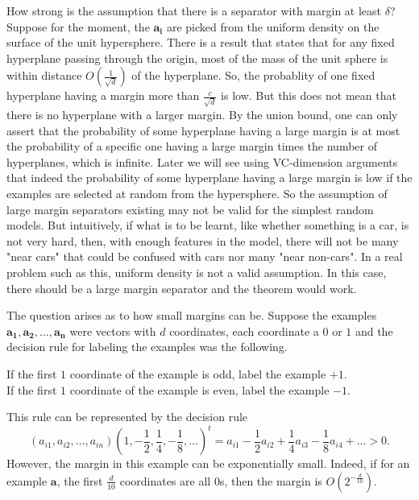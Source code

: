 How strong is the assumption that there is a separator with margin at least \(\delta \)? Suppose for the moment, the \(\mathbf{a_i} \) are picked from the uniform density on the surface of the unit hypersphere. There is a result that states that for any fixed hyperplane passing through the origin, most of the mass of the unit sphere is within distance \(O\left( \frac{1}{\sqrt{d} } \right) \) of the hyperplane. So, the probablity of one fixed hyperplane having a margin more than \(\frac{c}{\sqrt{d} }\) is low. But this does not mean that there is no hyperplane with a larger margin. By the union bound, one can only assert that the probability of some hyperplane having a large margin is at most the probability of a specific one having a large margin times the number of hyperplanes, which is infinite. Later we will see using VC-dimension arguments that indeed the probability of some hyperplane having a large margin is low if the examples are selected at random from the hypersphere. So the assumption of large margin separators existing may not be valid for the simplest random models. But intuitively, if what is to be learnt, like whether something is a car, is not very hard, then, with enough features in the model, there will not be many "near cars" that could be confused with cars nor many "near non-cars". In a real problem such as this, uniform density is not a valid assumption. In this case, there should be a large margin separator and the theorem would work.

The question arises as to how small margins can be. Suppose the examples \(\mathbf{a_1}, \mathbf{a_2}, \dots , \mathbf{a_n}   \) were vectors with \(d\) coordinates, each coordinate a \(0\) or \(1\) and the decision rule for labeling the examples was the following. 

\begin{center}
    If the first \(1\) coordinate of the example is odd, label the example \(+1\). \\
    If the first \(1\) coordinate of the example is even, label the example \(-1\). \\
\end{center}
This rule can be represented by the decision rule 
\[
    \left( a_{i1}, a_{i2}, \dots , a_{in}  \right) \left( 1, -\frac{1}{2}, \frac{1}{4}, -\frac{1}{8}, \dots  \right)^t = a_{i1} - \frac{1}{2}a_{i2} + \frac{1}{4}a_{i3} - \frac{1}{8}a_{i4}+\dots >0.     
\]
However, the margin in this example can be exponentially small. Indeed, if for an example \(\mathbf{a} \), the first \(\frac{d}{10}\) coordinates are all \(0\)s, then the margin is \(O\left( 2^{-\frac{d}{10}} \right) \).     

